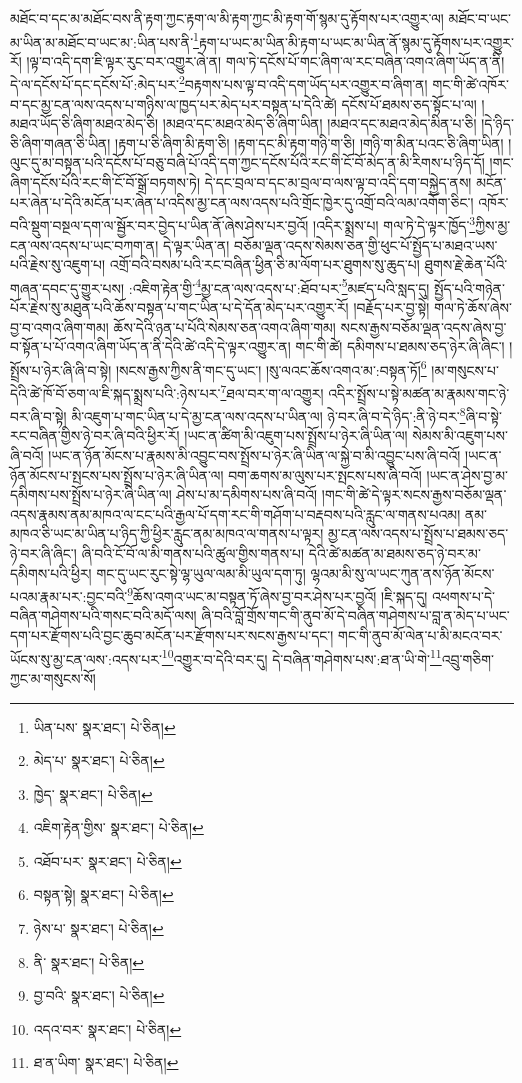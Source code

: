 མཐོང་བ་དང་མ་མཐོང་བས་ནི་རྟག་ཀྱང་རྟག་ལ་མི་རྟག་ཀྱང་མི་རྟག་གོ་སྙམ་དུ་རྟོགས་པར་འགྱུར་ལ། མཐོང་བ་ཡང་མ་ཡིན་མ་མཐོང་བ་ཡང་མ་:ཡིན་པས་ནི་\footnote{ཡིན་པས་  སྣར་ཐང་།  པེ་ཅིན། }རྟག་པ་ཡང་མ་ཡིན་མི་རྟག་པ་ཡང་མ་ཡིན་ནོ་སྙམ་དུ་རྟོགས་པར་འགྱུར་རོ། །ལྟ་བ་འདི་དག་ཇི་ལྟར་རུང་བར་འགྱུར་ཞེ་ན། གལ་ཏེ་དངོས་པོ་གང་ཞིག་ལ་རང་བཞིན་འགའ་ཞིག་ཡོད་ན་ནི། དེ་ལ་དངོས་པོ་དང་དངོས་པོ་:མེད་པར་\footnote{མེད་པ་  སྣར་ཐང་།  པེ་ཅིན། }བརྟགས་པས་ལྟ་བ་འདི་དག་ཡོད་པར་འགྱུར་བ་ཞིག་ན། གང་གི་ཚེ་འཁོར་བ་དང་མྱ་ངན་ལས་འདས་པ་གཉིས་ལ་ཁྱད་པར་མེད་པར་བསྟན་པ་དེའི་ཚེ། དངོས་པོ་ཐམས་ཅད་སྟོང་པ་ལ། །མཐའ་ཡོད་ཅི་ཞིག་མཐའ་མེད་ཅི། །མཐའ་དང་མཐའ་མེད་ཅི་ཞིག་ཡིན། །མཐའ་དང་མཐའ་མེད་མིན་པ་ཅི། །དེ་ཉིད་ཅི་ཞིག་གཞན་ཅི་ཡིན། །རྟག་པ་ཅི་ཞིག་མི་རྟག་ཅི། །རྟག་དང་མི་རྟག་གཉི་ག་ཅི། །གཉི་ག་མིན་པའང་ཅི་ཞིག་ཡིན། །ལུང་དུ་མ་བསྟན་པའི་དངོས་པོ་བཅུ་བཞི་པོ་འདི་དག་ཀྱང་དངོས་པོའི་རང་གི་ངོ་བོ་མེད་ན་མི་རིགས་པ་ཉིད་དོ། །གང་ཞིག་དངོས་པོའི་རང་གི་ངོ་བོ་སྒྲོ་བཏགས་ཏེ། དེ་དང་བྲལ་བ་དང་མ་བྲལ་བ་ལས་ལྟ་བ་འདི་དག་བསྐྱེད་ནས། མངོན་པར་ཞེན་པ་དེའི་མངོན་པར་ཞེན་པ་འདིས་མྱ་ངན་ལས་འདས་པའི་གྲོང་ཁྱེར་དུ་འགྲོ་བའི་ལམ་འགོག་ཅིང་། འཁོར་བའི་སྡུག་བསྔལ་དག་ལ་སྦྱོར་བར་བྱེད་པ་ཡིན་ནོ་ཞེས་ཤེས་པར་བྱའོ། །འདིར་སྨྲས་པ། གལ་ཏེ་དེ་ལྟར་ཁྱོད་\footnote{ཁྱེད་  སྣར་ཐང་།  པེ་ཅིན། }ཀྱིས་མྱ་ངན་ལས་འདས་པ་ཡང་བཀག་ན། དེ་ལྟར་ཡིན་ན། བཅོམ་ལྡན་འདས་སེམས་ཅན་གྱི་ཕུང་པོ་སྤྱོད་པ་མཐའ་ཡས་པའི་རྗེས་སུ་འཇུག་པ། འགྲོ་བའི་བསམ་པའི་རང་བཞིན་ཕྱིན་ཅི་མ་ལོག་པར་ཐུགས་སུ་ཆུད་པ། ཐུགས་རྗེ་ཆེན་པོའི་གཞན་དབང་དུ་གྱུར་པས། :འཇིག་རྟེན་གྱི་\footnote{འཇིག་རྟེན་གྱིས་  སྣར་ཐང་།  པེ་ཅིན། }མྱ་ངན་ལས་འདས་པ་:ཐོབ་པར་\footnote{འཐོབ་པར་  སྣར་ཐང་།  པེ་ཅིན། }མཛད་པའི་སླད་དུ། སྤྱོད་པའི་གཉེན་པོར་རྗེས་སུ་མཐུན་པའི་ཆོས་བསྟན་པ་གང་ཡིན་པ་དེ་དོན་མེད་པར་འགྱུར་རོ། །བརྗོད་པར་བྱ་སྟེ། གལ་ཏེ་ཆོས་ཞེས་བྱ་བ་འགའ་ཞིག་གམ། ཆོས་དེའི་ཉན་པ་པོའི་སེམས་ཅན་འགའ་ཞིག་གམ། སངས་རྒྱས་བཅོམ་ལྡན་འདས་ཞེས་བྱ་བ་སྟོན་པ་པོ་འགའ་ཞིག་ཡོད་ན་ནི་དེའི་ཚེ་འདི་དེ་ལྟར་འགྱུར་ན། གང་གི་ཚེ། དམིགས་པ་ཐམས་ཅད་ཉེར་ཞི་ཞིང་། །སྤྲོས་པ་ཉེར་ཞི་ཞི་བ་སྟེ། །སངས་རྒྱས་ཀྱིས་ནི་གང་དུ་ཡང་། །སུ་ལའང་ཆོས་འགའ་མ་:བསྟན་ཏོ།\footnote{བསྟན་སྟེ།  སྣར་ཐང་།  པེ་ཅིན། } །མ་གསུངས་པ་དེའི་ཚེ་ཁོ་བོ་ཅག་ལ་ཇི་སྐད་སྨྲས་པའི་:ཉེས་པར་\footnote{ཉེས་པ་  སྣར་ཐང་།  པེ་ཅིན། }ཐལ་བར་ག་ལ་འགྱུར། འདིར་སྤྲོས་པ་སྟེ་མཚན་མ་རྣམས་གང་ཉེ་བར་ཞི་བ་སྟེ། མི་འཇུག་པ་གང་ཡིན་པ་དེ་མྱ་ངན་ལས་འདས་པ་ཡིན་ལ། ཉེ་བར་ཞི་བ་དེ་ཉིད་:ནི་ཉེ་བར་\footnote{ནི་  སྣར་ཐང་།  པེ་ཅིན། }ཞི་བ་སྟེ་རང་བཞིན་གྱིས་ཉེ་བར་ཞི་བའི་ཕྱིར་རོ། །ཡང་ན་ཚིག་མི་འཇུག་པས་སྤྲོས་པ་ཉེར་ཞི་ཡིན་ལ། སེམས་མི་འཇུག་པས་ཞི་བའོ། །ཡང་ན་ཉོན་མོངས་པ་རྣམས་མི་འབྱུང་བས་སྤྲོས་པ་ཉེར་ཞི་ཡིན་ལ་སྐྱེ་བ་མི་འབྱུང་པས་ཞི་བའོ། །ཡང་ན་ཉོན་མོངས་པ་སྤངས་པས་སྤྲོས་པ་ཉེར་ཞི་ཡིན་ལ། བག་ཆགས་མ་ལུས་པར་སྤངས་པས་ཞི་བའོ། །ཡང་ན་ཤེས་བྱ་མ་དམིགས་པས་སྤྲོས་པ་ཉེར་ཞི་ཡིན་ལ། ཤེས་པ་མ་དམིགས་པས་ཞི་བའོ། །གང་གི་ཚེ་དེ་ལྟར་སངས་རྒྱས་བཅོམ་ལྡན་འདས་རྣམས་ནམ་མཁའ་ལ་ངང་པའི་རྒྱལ་པོ་དག་རང་གི་གཤོག་པ་བརྡབས་པའི་རླུང་ལ་གནས་པའམ། ནམ་མཁའ་ཅི་ཡང་མ་ཡིན་པ་ཉིད་ཀྱི་ཕྱིར་རླུང་ནམ་མཁའ་ལ་གནས་པ་ལྟར། མྱ་ངན་ལས་འདས་པ་སྤྲོས་པ་ཐམས་ཅད་ཉེ་བར་ཞི་ཞིང་། ཞི་བའི་ངོ་བོ་ལ་མི་གནས་པའི་ཚུལ་གྱིས་གནས་པ། དེའི་ཚེ་མཚན་མ་ཐམས་ཅད་ཉེ་བར་མ་དམིགས་པའི་ཕྱིར། གང་དུ་ཡང་རུང་སྟེ་ལྷ་ཡུལ་ལམ་མི་ཡུལ་དག་ཏུ། ལྷའམ་མི་སུ་ལ་ཡང་ཀུན་ནས་ཉོན་མོངས་པའམ་རྣམ་པར་:བྱང་བའི་\footnote{བྱ་བའི་  སྣར་ཐང་།  པེ་ཅིན། }ཆོས་འགའ་ཡང་མ་བསྟན་ཏོ་ཞེས་བྱ་བར་ཤེས་པར་བྱའོ། །ཇི་སྐད་དུ། འཕགས་པ་དེ་བཞིན་གཤེགས་པའི་གསང་བའི་མདོ་ལས། ཞི་བའི་བློ་གྲོས་གང་གི་ནུབ་མོ་དེ་བཞིན་གཤེགས་པ་བླ་ན་མེད་པ་ཡང་དག་པར་རྫོགས་པའི་བྱང་ཆུབ་མངོན་པར་རྫོགས་པར་སངས་རྒྱས་པ་དང་། གང་གི་ནུབ་མོ་ལེན་པ་མི་མངའ་བར་ཡོངས་སུ་མྱ་ངན་ལས་:འདས་པར་\footnote{འདའ་བར་  སྣར་ཐང་།  པེ་ཅིན། }འགྱུར་བ་དེའི་བར་དུ། དེ་བཞིན་གཤེགས་པས་:ཐ་ན་ཡི་གེ་\footnote{ཐ་ན་ཡིག་  སྣར་ཐང་།  པེ་ཅིན། }འབྲུ་གཅིག་ཀྱང་མ་གསུངས་སོ། 